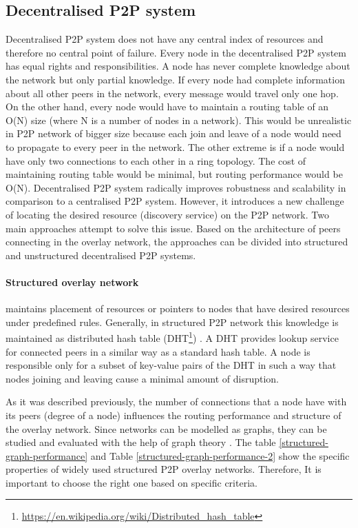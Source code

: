 \subsection{Decentralised P2P system}
\quad Decentralised P2P system does not have any central index of resources and therefore no central point of failure. Every node in the decentralised P2P system has equal rights and responsibilities. A node has never complete knowledge about the network but only partial knowledge. If every node had complete information about all other peers in the network, every message would travel only one hop. On the other hand, every node would have to maintain a routing table of an O(N) size (where N is a number of nodes in a network). This would be unrealistic in P2P network of bigger size because each join and leave of a node would need to propagate to every peer in the network. The other extreme is if a node would have only two connections to each other in a ring topology. The cost of maintaining routing table would be minimal, but routing performance would be O(N). Decentralised P2P system radically improves robustness and scalability in comparison to a centralised P2P system. However, it introduces a new challenge of locating the desired resource (discovery service) on the P2P network. Two main approaches attempt to solve this issue. Based on the architecture of peers connecting in the overlay network, the approaches can be divided into structured and unstructured decentralised P2P systems. \cite{koegel_buford_p2p_2009}

\paragraph{Structured overlay network} maintains placement of resources or pointers to nodes that have desired resources under predefined rules. Generally, in structured P2P network this knowledge is maintained as distributed hash table (DHT\footnote{\url{https://en.wikipedia.org/wiki/Distributed_hash_table}}) \cite{korzun_structured_2013}. A DHT provides lookup service for connected peers in a similar way as a standard hash table. A node is responsible only for a subset of key-value pairs of the DHT in such a way that nodes joining and leaving cause a minimal amount of disruption.

As it was described previously, the number of connections that a node have with its peers (degree of a node) influences the routing performance and structure of the overlay network. Since networks can be modelled as graphs, they can be studied and evaluated with the help of graph theory \cite{loguinov_graph-theoretic_2003}. The table \ref{structured-graph-performance} and Table \ref{structured-graph-performance-2} show the specific properties of widely used structured P2P overlay networks. Therefore, It is important to choose the right one based on specific criteria.

